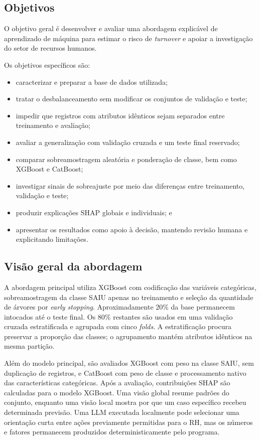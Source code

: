 \documentclass[12pt]{article}
\begin{document}
\subsection{Objetivos}

O objetivo geral é desenvolver e avaliar uma abordagem explicável de aprendizado de máquina para estimar o risco de \textit{turnover} e apoiar a investigação do setor de recursos humanos.

Os objetivos específicos são:

\begin{itemize}
    \item caracterizar e preparar a base de dados utilizada;
    \item tratar o desbalanceamento sem modificar os conjuntos de validação e teste;
    \item impedir que registros com atributos idênticos sejam separados entre treinamento e avaliação;
    \item avaliar a generalização com validação cruzada e um teste final reservado;
    \item comparar sobreamostragem aleatória e ponderação de classe, bem como XGBoost e CatBoost;
    \item investigar sinais de sobreajuste por meio das diferenças entre treinamento, validação e teste;
    \item produzir explicações SHAP globais e individuais; e
    \item apresentar os resultados como apoio à decisão, mantendo revisão humana e explicitando limitações.
\end{itemize}

\subsection{Visão geral da abordagem}

A abordagem principal utiliza XGBoost com codificação das variáveis categóricas, sobreamostragem da classe SAIU apenas no treinamento e seleção da quantidade de árvores por \textit{early stopping}. Aproximadamente 20\% da base permanecem intocados até o teste final. Os 80\% restantes são usados em uma validação cruzada estratificada e agrupada com cinco \textit{folds}. A estratificação procura preservar a proporção das classes; o agrupamento mantém atributos idênticos na mesma partição.

Além do modelo principal, são avaliados XGBoost com peso na classe SAIU, sem duplicação de registros, e CatBoost com peso de classe e processamento nativo das características categóricas. Após a avaliação, contribuições SHAP são calculadas para o modelo XGBoost. Uma visão global resume padrões do conjunto, enquanto uma visão local mostra por que um caso específico recebeu determinada previsão. Uma LLM executada localmente pode selecionar uma orientação curta entre ações previamente permitidas para o RH, mas os números e fatores permanecem produzidos deterministicamente pelo programa.
\end{document}
